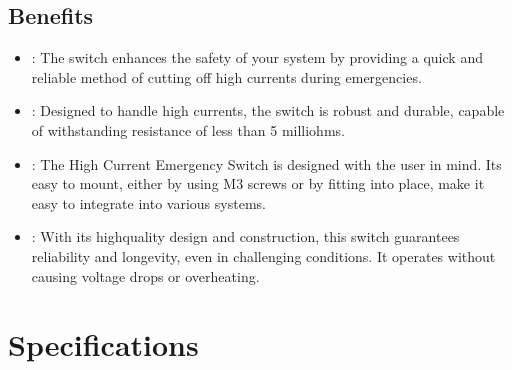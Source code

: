 \documentclass[letterpaper,10pt,english]{sphinxmanual}
\begin{document}
\section{Benefits}
\label{\detokenize{overview:benefits}}\begin{itemize}
\item {} 
\sphinxAtStartPar
{}: The switch enhances the safety of your system by providing a quick and reliable method of cutting off high currents during emergencies.

\item {} 
\sphinxAtStartPar
{}: Designed to handle high currents, the switch is robust and durable, capable of withstanding resistance of less than 5 milliohms.

\item {} 
\sphinxAtStartPar
{}: The High Current Emergency Switch is designed with the user in mind. Its easy to mount, either by using M3 screws or by fitting into place, make it easy to integrate into various systems.

\item {} 
\sphinxAtStartPar
{}: With its high\sphinxhyphen{}quality design and construction, this switch guarantees reliability and longevity, even in challenging conditions. It operates without causing voltage drops or overheating.

\end{itemize}

\sphinxstepscope


\chapter{Specifications}
\label{\detokenize{specifications:specifications}}\label{\detokenize{specifications::doc}}
\end{document}

